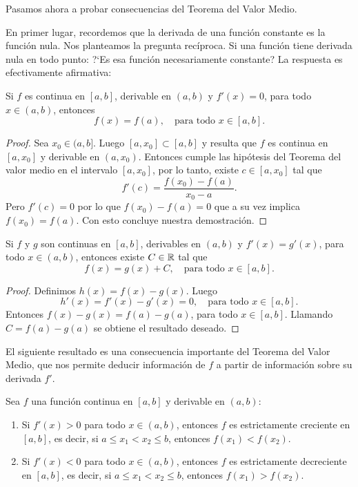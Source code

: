 Pasamos ahora a probar consecuencias del Teorema del Valor Medio.

En primer lugar, recordemos que la derivada de una función constante es la función nula.
Nos planteamos la pregunta recíproca. Si una función tiene derivada nula en todo punto: ?`Es esa función necesariamente constante?
La respuesta es efectivamente afirmativa:

\begin{proposition}
    Si $f$ es continua en $[a,b]$, derivable en $(a,b)$ y $f'(x)=0$, para todo $x\in(a,b)$, entonces %
    \[ 
    f(x)=f(a), \quad\text{para todo $x\in [a,b]$}.
    \]
\end{proposition}

\begin{proof}
    Sea $x_0 \in (a,b]$. Luego $[a,x_0]\subset [a,b]$ y resulta que $f$ es continua en $[a,x_0]$ y derivable en $(a,x_0)$. Entonces cumple las hipótesis del Teorema del valor medio en el intervalo $[a,x_0]$, por lo tanto, existe $c\in [a,x_0]$ tal que 
    \[
    f'(c) = \frac{f(x_0)-f(a)}{x_0-a}.
    \]
    Pero $f'(c)=0$ por lo que $f(x_0)-f(a)=0$ que a su vez implica $f(x_0)=f(a)$. Con esto concluye nuestra demostración.
\end{proof}

\begin{corollary}\label{C:f=g+k}
    Si $f$ y $g$ son continuas en $[a,b]$, derivables en $(a,b)$ y $f'(x)=g'(x)$, para todo $x\in(a,b)$, entonces existe $C\in\mathbb{R}$ tal que 
    \[ 
    f(x)=g(x)+C, \quad\text{para todo $x\in [a,b]$}.
    \]
\end{corollary}

\begin{proof}
    Definimos $h(x)=f(x)-g(x)$. Luego 
    \[
    h'(x)=f'(x)-g'(x)=0, \quad\text{para todo $x\in [a,b]$}.
    \]
    Entonces $f(x)-g(x)=f(a)-g(a)$, para todo $x\in[a,b]$. 
    Llamando $C=f(a)-g(a)$ se obtiene el resultado deseado.
\end{proof}

El siguiente resultado es una consecuencia importante del Teorema del Valor Medio, que nos permite deducir información de $f$ a partir de información sobre su derivada $f'$.

\begin{proposition}\label{P:signo-derivada=>tendencia}
    Sea $f$ una función continua en $[a,b]$ y derivable en $(a,b)$:
    \begin{enumerate}
        \item Si $f'(x)>0$ para todo $x\in(a,b)$, entonces $f$ es estrictamente creciente en $[a,b]$, 
        es decir, si $a\le x_1<x_2\le b$, entonces $f(x_1)<f(x_2)$.
        \item Si $f'(x)<0$ para todo $x\in(a,b)$, entonces $f$ es estrictamente decreciente en $[a,b]$,
        es decir, si $a\le x_1<x_2\le b$, entonces $f(x_1)>f(x_2)$.
    \end{enumerate}
\end{proposition}

